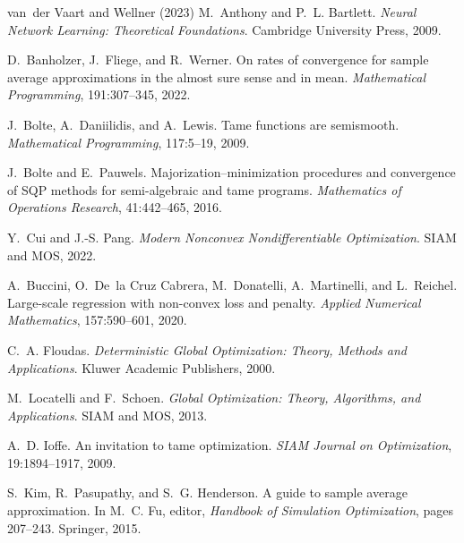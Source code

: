 \documentclass[11pt]{article}
\begin{document}
\begin{thebibliography}{van~der Vaart and Wellner (2023)}
 M.~Anthony
and P.~L. Bartlett. \newblock \emph{Neural Network Learning: Theoretical
Foundations}. \newblock Cambridge University Press, 2009.

D.~Banholzer, J.~Fliege, and R.~Werner. \newblock On rates of
convergence for sample average approximations in the almost sure sense
and in mean. \newblock \emph{Mathematical Programming}, 191:307--345,
2022.

J.~Bolte, A.~Daniilidis, and A.~Lewis. \newblock Tame functions
are semismooth. \newblock \emph{Mathematical Programming}, 117:5--19,
2009.

 J.~Bolte and
E.~Pauwels. \newblock Majorization--minimization procedures and
convergence of {SQP} methods for semi-algebraic and tame programs.
\newblock \emph{Mathematics of Operations Research}, 41:442--465,
2016.

 Y.~Cui and J.-S. Pang.
\newblock \emph{Modern Nonconvex Nondifferentiable Optimization}.
\newblock SIAM and MOS, 2022.

A.~Buccini, O.~De~la Cruz Cabrera, M.~Donatelli, A.~Martinelli,
and L.~Reichel. \newblock Large-scale regression with non-convex
loss and penalty. \newblock \emph{Applied Numerical Mathematics},
157:590--601, 2020.

 C.~A. Floudas. \newblock
\emph{Deterministic Global Optimization: Theory, Methods and Applications}.
\newblock Kluwer Academic Publishers, 2000.

M.~Locatelli and F.~Schoen. \newblock \emph{Global Optimization: Theory,
Algorithms, and Applications}. \newblock SIAM and MOS, 2013.

 A.~D. Ioffe. \newblock An invitation
to tame optimization. \newblock \emph{SIAM Journal on Optimization},
19:1894--1917, 2009.

S.~Kim, R.~Pasupathy, and S.~G. Henderson. \newblock A guide to
sample average approximation. \newblock In M.~C. Fu, editor, \emph{Handbook
of Simulation Optimization}, pages 207--243. Springer, 2015.


\end{thebibliography}
\end{document}
